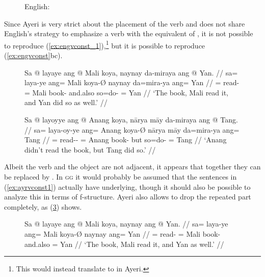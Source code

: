 \begin{figure}[h]
\pex\label{ex:engvconst}
English:
\a\label{ex:engvconst_1} 
\a\label{ex:engvconst_2} 
\a\label{ex:engvconst_3} 
\xe
\end{figure}

Since Ayeri is very strict about the placement of the verb and does not share
English's strategy to emphasize a verb with the equivalent of , it is
not possible to reproduce (\ref{ex:engvconst_1}),\footnote{This would instead
translate to  in Ayeri.} but it is possible to reproduce 
(\ref{ex:engvconst}bc).

\begin{figure}[h]
\pex\label{ex:ayrvconst1}
\a\label{ex:ayrvconst1_1}\begingl
	\gla Sa @ layaye ang @ Mali koya, naynay da-miraya ang @ Yan. //
	\glb sa= laya-ye ang= Mali koya-Ø naynay da=mira-ya ang= Yan //
	\glc \PatT{}= read-\TsgF{} \Aarg{}= Mali book-\Top{} and.also so=do-\TsgM{}
		\Aarg{}= Yan //
	\glft `The book, Mali read it, and Yan did so as well.' //
\endgl

\a\label{ex:ayrvconst1_2}\begingl
	\gla Sa @ layoyye ang @ Anang koya, nārya māy da-miraya ang @ Tang. //
	\glb sa= laya-oy-ye ang= Anang koya-Ø nārya māy da=mira-ya ang= Tang //
	\glc \PatT{}= read-\Neg{}-\TsgF{} \Aarg{}= Anang book-\Top{} but \Aff{}
		so=do-\TsgM{} \Aarg{}= Tang //
	\glft `Anang didn't read the book, but Tang did so.' //
\endgl
\xe
\end{figure}

Albeit the verb and the object are not adjacent, it appears that together
they can be replaced by . In \textsc{gg}
it would probably be assumed that the sentences in (\ref{ex:ayrvconst1})
actually have 
underlying, though it should also be possible to analyze this in terms of
f-structure. Ayeri also allows to drop the repeated part completely, as
(\ref{ex:ayrvconst2}) shows.

\begin{figure}[h]
\ex\label{ex:ayrvconst2}\begingl
	\gla Sa @ layaye ang @ Mali koya, naynay ang @ Yan. //
	\glb sa= laya-ye ang= Mali koya-Ø naynay ang= Yan //
	\glc \PatT{}= read-\TsgF{} \Aarg{}= Mali book-\Top{} and.also \Aarg{}= 
		Yan //
	\glft `The book, Mali read it, and Yan as well.' //
\endgl
\xe
\end{figure}

